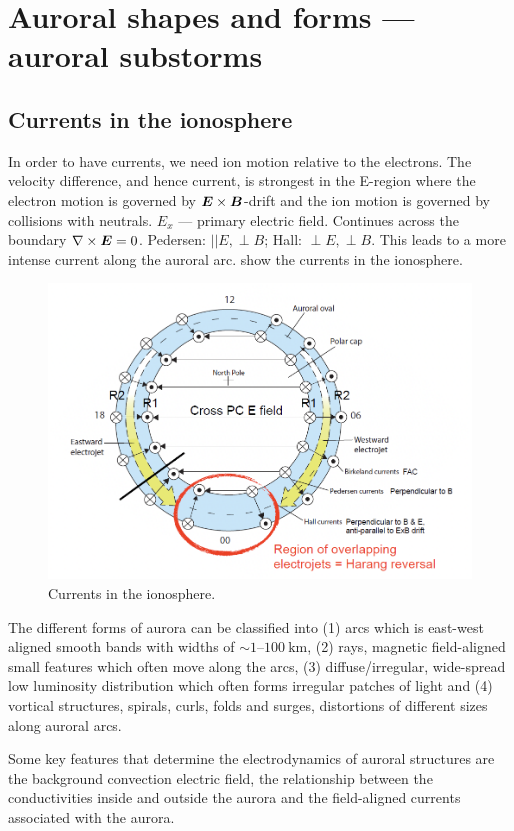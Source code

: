 \section{Auroral shapes and forms --- auroral substorms}
\subsection{Currents in the ionosphere}
In order to have currents, we need ion motion relative to the electrons. The velocity difference, and hence current, is strongest in the E-region where the electron motion is governed by \(\boldsymbol{E}\times\boldsymbol{B}\)-drift and the ion motion is governed by collisions with neutrals.
\(E_x\) --- primary electric field. Continues across the boundary \(\nabla\times\boldsymbol{E}=0\). Pedersen: \(\vert\vert E,\perp B\); Hall: \(\perp E,\perp B\). This leads to a more intense current along  the auroral arc.  show the currents in the ionosphere.
\begin{figure}[t]
    \centering
    \includegraphics[width=.8\linewidth]{bilder/L4_E-reg_currents.png}
    \caption{Currents in the ionosphere.}\label{fig:L4_E-reg_currents}
\end{figure}
The different forms of aurora can be classified into (1) arcs which is east-west aligned smooth bands with widths of \(\sim 1\)--\(\SI{100}{\kilo\metre}\), (2) rays, magnetic field-aligned small features which often move along the arcs, (3) diffuse/irregular, wide-spread low luminosity distribution which often forms irregular patches of light and (4) vortical structures, spirals, curls, folds and surges, distortions of different sizes along auroral arcs.

Some key features that determine the electrodynamics of auroral structures are the background convection electric field, the relationship between the conductivities inside and outside the aurora and the field-aligned currents associated with the aurora.

